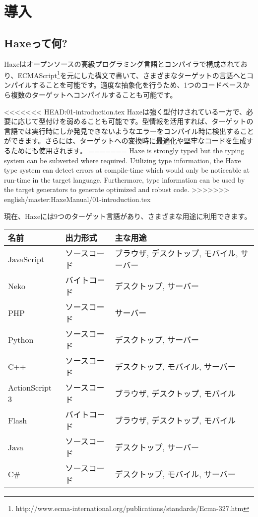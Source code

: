 \chapter{導入}
\label{introduction}

\section{Haxeって何?}
\label{introduction-what-is-haxe}


Haxeはオープンソースの高級プログラミング言語とコンパイラで構成されており、ECMAScript\footnote{http://www.ecma-international.org/publications/standards/Ecma-327.htm}を元にした構文で書いて、さまざまなターゲットの言語へとコンパイルすることを可能です。適度な抽象化を行うため、1つのコードベースから複数のターゲットへコンパイルすることも可能です。

<<<<<<< HEAD:01-introduction.tex
Haxeは強く型付けされている一方で、必要に応じて型付けを弱めることも可能です。型情報を活用すれば、ターゲットの言語では実行時にしか発見できないようなエラーをコンパイル時に検出することができます。さらには、ターゲットへの変換時に最適化や堅牢なコードを生成するためにも使用されます。
=======
Haxe is strongly typed but the typing system can be subverted where required. Utilizing type information, the Haxe type system can detect errors at compile-time which would only be noticeable at run-time in the target language. Furthermore, type information can be used by the target generators to generate optimized and robust code.
>>>>>>> english/master:HaxeManual/01-introduction.tex

現在、Haxeには9つのターゲット言語があり、さまざまな用途に利用できます。

\begin{center}
\begin{tabular}{| l | l | l |}
	\hline
	名前 & 出力形式 & 主な用途 \\ \hline
	JavaScript & ソースコード & ブラウザ, デスクトップ, モバイル, サーバー \\
	Neko & バイトコード & デスクトップ, サーバー \\
	PHP & ソースコード & サーバー \\
	Python & ソースコード & デスクトップ, サーバー \\
	C++ & ソースコード & デスクトップ, モバイル, サーバー \\
	ActionScript 3 & ソースコード & ブラウザ, デスクトップ, モバイル \\
	Flash & バイトコード & ブラウザ, デスクトップ, モバイル \\ 
	Java & ソースコード & デスクトップ, サーバー \\
	C\# & ソースコード & デスクトップ, モバイル, サーバー \\ \hline
\end{tabular}
\end{center}

